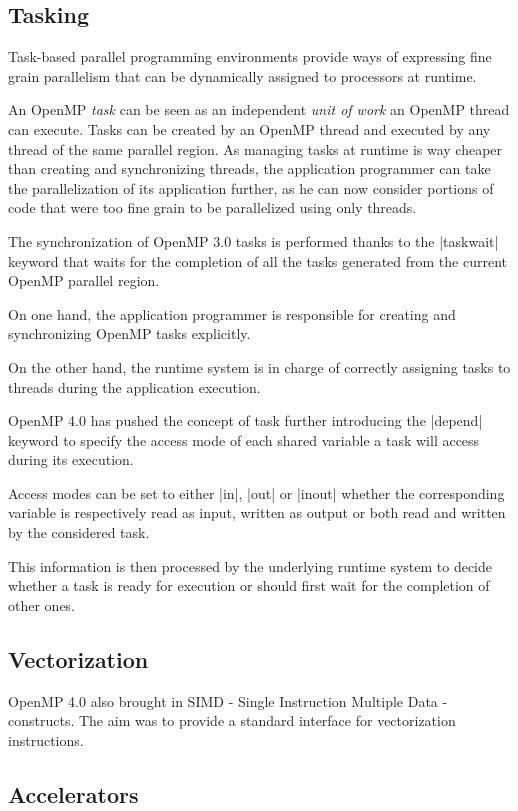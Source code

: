 \subsection{Tasking}

Task-based parallel programming environments provide ways of expressing fine grain parallelism that can be dynamically assigned to processors at runtime.

An OpenMP \emph{task} can be seen as an independent \emph{unit of work} an OpenMP thread can execute.
Tasks can be created by an OpenMP thread and executed by any thread of the same parallel region.
As managing tasks at runtime is way cheaper than creating and synchronizing threads, the application programmer can take the parallelization of its application further, as he can now consider portions of code that were too fine grain to be parallelized using only threads.

The synchronization of OpenMP 3.0 tasks is performed thanks to the |taskwait| keyword that waits for the completion of all the tasks generated from the current OpenMP parallel region.

On one hand, the application programmer is responsible for creating and synchronizing OpenMP tasks explicitly.

On the other hand, the runtime system is in charge of correctly assigning tasks to threads during the application execution.

OpenMP 4.0 has pushed the concept of task further introducing the |depend| keyword to specify the access mode of each shared variable a task will access during its execution.

Access modes can be set to either |in|, |out| or |inout| whether the corresponding variable is respectively read as input, written as output or both read and written by the considered task.

This information is then processed by the underlying runtime system to decide whether a task is ready for execution or should first wait for the completion of other ones.


\subsection{Vectorization}

OpenMP 4.0 also brought in SIMD - Single Instruction Multiple Data - constructs.
The aim was to provide a standard interface for vectorization instructions.


\subsection{Accelerators}

